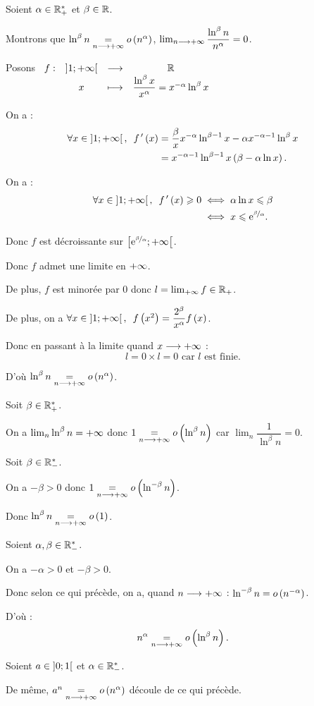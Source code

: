 \begin{dem}
Soient \(\alpha\in\mathbb{R}_+^*\) et \(\beta\in\mathbb{R}\).

Montrons que \(\ln^\beta n\underset{n\longrightarrow+\infty}{=}o\left(n^\alpha\right)\), \cad \(\lim_{n\longrightarrow+\infty}\dfrac{\ln^\beta n}{n^\alpha}=0\).

Posons \(\begin{array}[t]{cccc}f : & \left]1;+\infty\right[ & \longrightarrow & \mathbb{R} \\ & x & \longmapsto & \dfrac{\ln^\beta x}{x^\alpha}=x^{-\alpha}\ln^\beta x\end{array}\)

On a : \[\begin{aligned}
\quantifs{\forall x\in\intervee{1}{\pinf}}f\prim\paren{x}&=\dfrac{\beta}{x}x^{-\alpha}\ln^{\beta-1}x-\alpha x^{-\alpha-1}\ln^\beta x \\
&=x^{-\alpha-1}\ln^{\beta-1}x\paren{\beta-\alpha\ln x}.
\end{aligned}\]

On a : \[\begin{aligned}
\quantifs{\forall x\in\intervee{1}{\pinf}}f\prim\paren{x}\geq0&\ssi\alpha\ln x\leq\beta \\
&\ssi x\leq\e{\nicefrac{\beta}{\alpha}}.
\end{aligned}\]

Donc \(f\) est décroissante sur \(\left[\mathrm{e}^{\nicefrac{\beta}{\alpha}};+\infty\right[\).

Donc \(f\) admet une limite en \(+\infty\).

De plus, \(f\) est minorée par \(0\) donc \(l=\lim_{+\infty}f\in\mathbb{R}_+\).

De plus, on a \(\quantifs{\forall x\in\intervee{1}{\pinf}}f\paren{x^2}=\dfrac{2^\beta}{x^\alpha}f\paren{x}\).

Donc en passant à la limite quand \(x\longrightarrow+\infty\) : \[l=0\times l=0\text{ car }l\text{ est finie}.\]

D'où \(\ln^\beta n\underset{n\longrightarrow+\infty}{=}o\left(n^{\alpha}\right)\).
\end{dem}

\begin{dem}
Soit \(\beta\in\mathbb{R}_+^*\).

On a \(\lim_n\ln^\beta n=+\infty\) donc \(1\underset{n\longrightarrow+\infty}{=}o\left(\ln^\beta n\right)\) car \(\lim_n\dfrac{1}{\ln^\beta n}=0\).
\end{dem}

\begin{dem}
Soit \(\beta\in\mathbb{R}_-^*\).

On a \(-\beta>0\) donc \(1\underset{n\longrightarrow+\infty}{=}o\left(\ln^{-\beta}n\right)\).

Donc \(\ln^\beta n\underset{n\longrightarrow+\infty}{=}o\left(1\right)\).
\end{dem}

\begin{dem}
Soient \(\alpha,\beta\in\mathbb{R}_-^*\).

On a \(-\alpha>0\) et \(-\beta>0\).

Donc selon ce qui précède, on a, quand \(n\longrightarrow+\infty\) : \(\ln^{-\beta}n=o\left(n^{-\alpha}\right)\).

D'où : \[n^\alpha\underset{n\longrightarrow+\infty}{=}o\left(\ln^\beta n\right).\]
\end{dem}

\begin{dem}
Soient \(a\in\left]0;1\right[\) et \(\alpha\in\mathbb{R}_-^*\).

De même, \(a^n\underset{n\longrightarrow+\infty}{=}o\left(n^\alpha\right)\) découle de ce qui précède.
\end{dem}